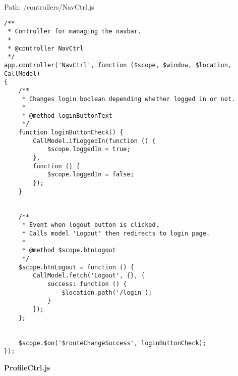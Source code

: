 Path: /controllers/NavCtrl.js
{\scriptsize
\begin{lstlisting}
/**
 * Controller for managing the navbar.
 *
 * @controller NavCtrl
 */
app.controller('NavCtrl', function ($scope, $window, $location, CallModel)
{
	/**
	 * Changes login boolean depending whether logged in or not.
	 *
	 * @method loginButtonText
	 */
	function loginButtonCheck() {
		CallModel.ifLoggedIn(function () {
			$scope.loggedIn = true;
		},
		function () {
			$scope.loggedIn = false;
		});
	}


	/**
	 * Event when logout button is clicked.
	 * Calls model 'Logout' then redirects to login page.
	 *
	 * @method $scope.btnLogout
	 */
	$scope.btnLogout = function () {
		CallModel.fetch('Logout', {}, {
			success: function () {
				$location.path('/login');
			}
		});
	};


	$scope.$on('$routeChangeSuccess', loginButtonCheck);
});\end{lstlisting}
}
\textbf{ProfileCtrl.js}

